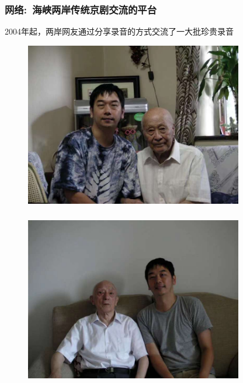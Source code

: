 \documentclass[cjk,slidestop,compress,mathserif,blue]{beamer}
\begin{document}
\frame
{
	\frametitle{网络:~海峡两岸传统京剧交流的平台}
	\textrm{2004}年起，两岸网友通过分享录音的方式交流了一大批珍贵录音
\begin{figure}[h!]
\centering
\vspace{-0.05in}
\includegraphics[height=0.6\textwidth,width=0.85\textwidth,clip]{Figures/PekOpe_Li-1.jpg}
\label{Li-1}
\end{figure}
}

\frame
{
	\frametitle{}
\begin{figure}[h!]
\centering
\vspace{-0.05in}
\includegraphics[height=0.6\textwidth,width=0.85\textwidth,clip]{Figures/PekOpe_Li-2.jpg}
\label{Li-2}
\end{figure}
}
\end{document}

